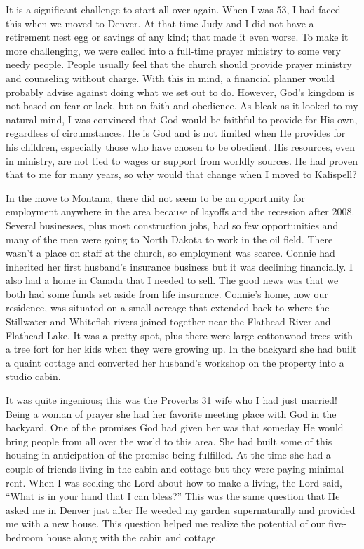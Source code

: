 \documentclass[twoside, 12pt]{book}
\begin{document}
It is a significant challenge to start all over again. When I was 53, I had faced this when we moved to Denver. At that time Judy and I did not have a retirement nest egg or savings of any kind; that made it even worse. To make it more challenging, we were called into a full-time prayer ministry to some very needy people. People usually feel that the church should provide prayer ministry and counseling without charge. With this in mind, a financial planner would probably advise against doing what we set out to do. However, God’s kingdom is not based on fear or lack, but on faith and obedience. As bleak as it looked to my natural mind, I was convinced that God would be faithful to provide for His own, regardless of circumstances. He is God and is not limited when He provides for his children, especially those who have chosen to be obedient. His resources, even in ministry, are not tied to wages or support from worldly sources. He had proven that to me for many years, so why would that change when I moved to Kalispell?

In the move to Montana, there did not seem to be an opportunity for employment anywhere in the area because of layoffs and the recession after 2008. Several businesses, plus most construction jobs, had so few opportunities and many of the men were going to North Dakota to work in the oil field. There wasn’t a place on staff at the church, so employment was scarce. Connie had inherited her first husband’s insurance business but it was declining financially. I also had a home in Canada that I needed to sell. The good news was that we both had some funds set aside from life insurance. Connie’s home, now our residence, was situated on a small acreage that extended back to where the Stillwater and Whitefish rivers joined together near the Flathead River and Flathead Lake. It was a pretty spot, plus there were large cottonwood trees with a tree fort for her kids when they were growing up. In the backyard she had built a quaint cottage and converted her husband’s workshop on the property into a studio cabin. 

It was quite ingenious; this was the Proverbs 31 wife who I had just married! Being a woman of prayer she had her favorite meeting place with God in the backyard. One of the promises God had given her was that someday He would bring people from all over the world to this area. She had built some of this housing in anticipation of the promise being fulfilled. At the time she had a couple of friends living in the cabin and cottage but they were paying  minimal rent. When I was seeking the Lord about how to make a living, the Lord said, “What is in your hand that I can bless?” This was the same question that He asked me in Denver just after He weeded my garden supernaturally and provided me with a new house. This question helped me realize the potential of our five-bedroom house along with the cabin and cottage.
\end{document}
